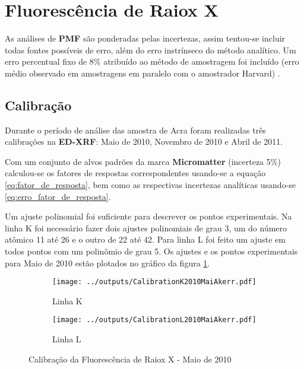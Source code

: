 \section{Fluorescência de Raiox X}

As análises de \textbf{PMF} são ponderadas pelas incertezas, assim 
tentou-se incluir todas fontes possíveis de erro, além do erro instrínseco 
do método analítico. Um erro percentual fixo de 8\% atribuído ao método 
de amostragem foi incluído 
(erro médio observado em amostragens em paralelo com o amostrador Harvard)
\citep{santos2014}.

\subsection{Calibração}

Durante o período de análise das amostra de Acra foram realizadas 
três calibrações na \textbf{ED-XRF}: Maio de 2010, Novembro de 2010
e Abril de 2011. 

Com um conjunto de alvos padrões da marca \textbf{Micromatter} 
(incerteza 5\%) calculou-se os fatores de respostas correspondentes
usando-se a equação \ref{eq:fator_de_resposta}, bem como as respectivas
incertezas analíticas usando-se \ref{eq:erro_fator_de_resposta}.

Um ajuste polinomial foi suficiente para descrever os pontos experimentais. 
Na linha K foi necessário fazer dois ajustes polinomiais de grau 3, um do 
número atômico 11 até 26 e o outro de 22 até 42. Para linha L foi 
feito um ajuste em todos pontos com um polinômio de grau 5.
Os ajustes e os pontos experimentais para Maio de 2010 estão plotados no 
gráfico da figura \ref{fig:edx_calib_KLmaio2010}.

\begin{figure}[H]
  \begin{subfigure}[b]{0.5\textwidth}
    \texttt{[image: ../outputs/CalibrationK2010MaiAkerr.pdf]}
    \caption{Linha K}
  \end{subfigure}%
  \begin{subfigure}[b]{0.5\textwidth}
    \texttt{[image: ../outputs/CalibrationL2010MaiAkerr.pdf]}
    \caption{Linha L}
  \end{subfigure}
  \caption{Calibração da Fluorescência de Raiox X - Maio de 2010 \label{fig:edx_calib_KLmaio2010}}
\end{figure}


